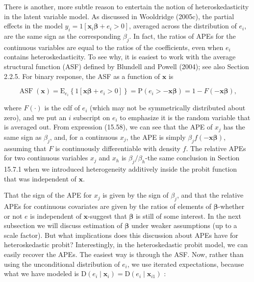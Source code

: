 \documentclass[10pt]{article}
\begin{document}
There is another, more subtle reason to entertain the notion of heteroskedasticity in the latent variable model. As discussed in Wooldridge (2005c), the partial effects in the model $y_{i}=1\left[\mathbf{x}_{i} \boldsymbol{\beta}+e_{i}>0\right]$, averaged across the distribution of $e_{i}$, are the same sign as the corresponding $\beta_{j}$. In fact, the ratios of APEs for the continuous variables are equal to the ratios of the coefficients, even when $e_{i}$ contains heteroskedasticity. To see why, it is easiest to work with the average structural function (ASF) defined by Blundell and Powell (2004); see also Section 2.2.5. For binary response, the ASF as a function of $\mathbf{x}$ is


\begin{equation*}
\operatorname{ASF}(\mathbf{x})=\mathrm{E}_{e_{i}}\left\{1\left[\mathbf{x} \boldsymbol{\beta}+e_{i}>0\right]\right\}=\mathrm{P}\left(e_{i}>-\mathbf{x} \boldsymbol{\beta}\right)=1-F(-\mathbf{x} \boldsymbol{\beta}), \tag{15.58}
\end{equation*}


where $F(\cdot)$ is the cdf of $e_{i}$ (which may not be symmetrically distributed about zero), and we put an $i$ subscript on $e_{i}$ to emphasize it is the random variable that is averaged out. From expression (15.58), we can see that the APE of $x_{j}$ has the same sign as $\beta_{j}$, and, for a continuous $x_{j}$, the APE is simply $\beta_{j} f(-\mathbf{x} \boldsymbol{\beta})$, assuming that $F$ is continuously differentiable with density $f$. The relative APEs for two continuous variables $x_{j}$ and $x_{h}$ is $\beta_{j} / \beta_{h}$-the same conclusion in Section 15.7.1 when we introduced heterogeneity additively inside the probit function that was independent of $\mathbf{x}$.

That the sign of the APE for $x_{j}$ is given by the sign of $\beta_{j}$, and that the relative APEs for continuous covariates are given by the ratios of elements of $\boldsymbol{\beta}$-whether or not $e$ is independent of $\mathbf{x}$-suggest that $\boldsymbol{\beta}$ is still of some interest. In the next subsection we will discuss estimation of $\boldsymbol{\beta}$ under weaker assumptions (up to a scale factor). But what implications does this discussion about APEs have for heteroskedastic probit? Interestingly, in the heteroskedastic probit model, we can easily recover the APEs. The easiest way is through the ASF. Now, rather than using the unconditional distribution of $e_{i}$, we use iterated expectations, because what we have modeled is $\mathrm{D}\left(e_{i} \mid \mathbf{x}_{i}\right)=\mathrm{D}\left(e_{i} \mid \mathbf{x}_{i 1}\right)$ :
\end{document}
